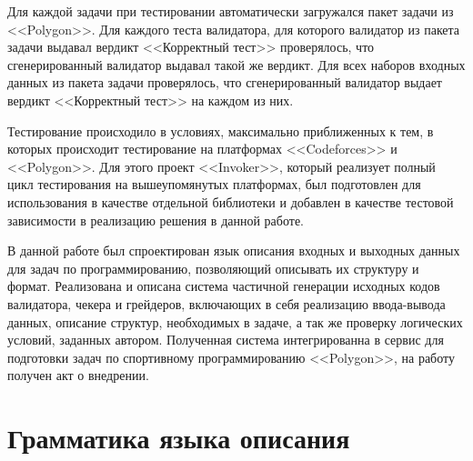 \documentclass[times,specification,annotation]{style/itmo-student-thesis/itmo-student-thesis}
\begin{document}
Для каждой задачи при тестировании автоматически загружался пакет задачи из <<Polygon>>. Для каждого теста валидатора, для которого валидатор из пакета задачи выдавал вердикт <<Корректный тест>> проверялось, что сгенерированный валидатор выдавал такой же вердикт. Для всех наборов входных данных из пакета задачи проверялось, что сгенерированный валидатор выдает вердикт <<Корректный тест>> на каждом из них. 

Тестирование происходило в условиях, максимально приближенных к тем, в которых происходит тестирование на платформах <<Codeforces>> и <<Polygon>>. Для этого проект <<Invoker>>, который реализует полный цикл тестирования на вышеупомянутых платформах, был подготовлен для использования в качестве отдельной библиотеки и добавлен в качестве тестовой зависимости в реализацию решения в данной работе.

\startconclusionpage

В данной работе был спроектирован язык описания входных и выходных данных для задач по программированию, позволяющий описывать их структуру и формат. Реализована и описана система частичной генерации исходных кодов валидатора, чекера и грейдеров, включающих в себя реализацию ввода-вывода данных, описание структур, необходимых в задаче, а так же проверку логических условий, заданных автором. Полученная система интегрированна в сервис для подготовки задач по спортивному программированию <<Polygon>>, на работу получен акт о внедрении.

\printmainbibliography

\appendix

\chapter{Грамматика языка описания}\label{appendix-antlr-grammar}
\end{document}
